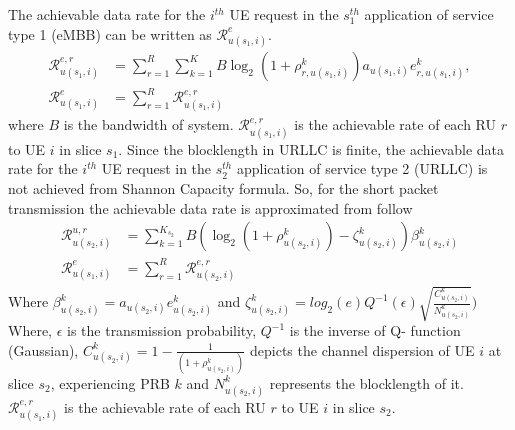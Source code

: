 \documentclass[conference]{IEEEtran}
\begin{document}
The achievable data rate for the $i^{th}$ UE request in the $s_{1}^{th}$ application of service type 1 (eMBB) can be written as $\mathcal{R}_{u(s_1,i)}^{e}$.
\begin{equation}\label{eq1}
\begin{split}
\mathcal{R}_{u(s_1,i)}^{e,r} &= \sum_{r=1}^{R}\sum_{k=1}^{K} B \log_2({1+ \rho_{r,u(s_1,i)}^{k}})a_{u(s_1,i)} e^k_{r,u(s_1,i)},\\
\mathcal{R}_{u(s_1,i)}^{e} &= \sum_{r=1}^{R}\mathcal{R}_{u(s_1,i)}^{e,r} 
\end{split}
\end{equation}
where $B$ is the bandwidth of system. 
$\mathcal{R}_{u(s_1,i)}^{e,r}$ is the achievable rate of each RU $r$ to UE $i$ in slice $s_1$.
Since the blocklength in URLLC is finite, the achievable data rate for the $i^{th}$ UE request in the $s_{2}^{th}$ application of service type 2 (URLLC) is not achieved from Shannon Capacity formula. So, for the short packet transmission the achievable data rate is approximated from follow
\begin{equation}\label{eq11}
\begin{split}
\mathcal{R}_{u(s_2,i)}^{u,r} &= \sum_{k=1}^{K_{s_2}} B (\log_2({1+ \rho_{u(s_2,i)}^{k}})- \zeta_{u(s_2,i)}^{k}){\beta}_{u(s_2,i)}^{k}\\
\mathcal{R}_{u(s_1,i)}^{e} &= \sum_{r=1}^{R}\mathcal{R}_{u(s_2,i)}^{e,r} 
\end{split}
\end{equation}
Where ${\beta}_{u(s_2,i)}^{k}=a_{u(s_2,i)} e^{k}_{u(s_2,i)}$
and $\zeta_{u(s_2,i)}^{k} = log_2({e})Q^{-1}(\epsilon) \sqrt{\frac{C_{u(s_2,i)}^{k}}{N_{u(s_2,i)}^{k}}})$
Where, $\epsilon $ is the transmission probability, $Q^{-1}$ is the inverse of Q- function (Gaussian),
$C_{u(s_2,i)}^{k} = 1 - \frac{1}{(1+\rho_{u(s_2,i)}^{k})}$ depicts the channel dispersion of UE  $i$ at slice $s_2$, experiencing PRB $k$ and
$N_{u(s_2,i)}^{k}$ represents the blocklength of it. 
$\mathcal{R}_{u(s_1,i)}^{e,r}$ is the achievable rate of each RU $r$ to UE $i$ in slice $s_2$.
\end{document}
